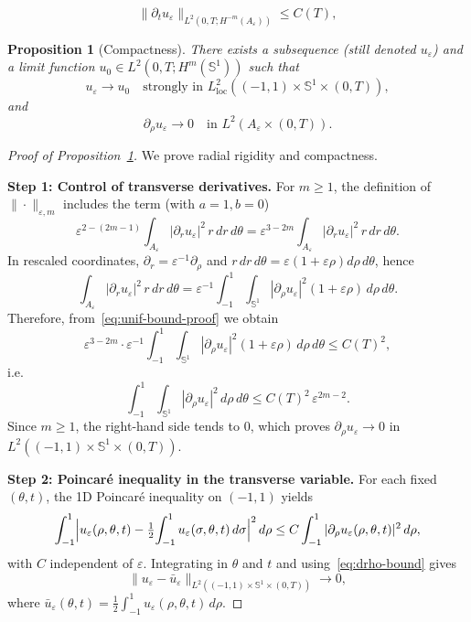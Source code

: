 \documentclass[10pt,a4paper]{amsart}
\newtheorem{proposition}{Proposition}
\begin{document}
\begin{equation}
\label{eq:time-bound}
\|\partial_t u_\varepsilon\|_{L^2(0,T;H^{-m}(A_\varepsilon))}\le C(T),
\end{equation}

\begin{proposition}[Compactness]
\label{prop:compactness}
There exists a subsequence (still denoted $u_\varepsilon$) and a limit function
$u_0\in L^2(0,T;H^m(\mathbb S^1))$ such that
\[
u_\varepsilon \longrightarrow u_0
\quad\text{strongly in }L^2_{\mathrm{loc}}((-1,1)\times\mathbb S^1\times(0,T)),
\]
and
\[
\partial_\rho u_\varepsilon \longrightarrow 0
\quad\text{in }L^2(A_\varepsilon\times(0,T)).
\]
\end{proposition}

\begin{proof}[Proof of Proposition~\ref{prop:compactness}]
We prove radial rigidity and compactness.

\smallskip
\noindent\textbf{Step 1: Control of transverse derivatives.}
For \(m\ge1\), the definition of \(\|\cdot\|_{\varepsilon,m}\) includes the term
(with \(a=1,b=0\))
\[
\varepsilon^{2-(2m-1)}\int_{A_\varepsilon}|\partial_r u_\varepsilon|^2\,r\,dr\,d\theta
=
\varepsilon^{3-2m}\int_{A_\varepsilon}|\partial_r u_\varepsilon|^2\,r\,dr\,d\theta.
\]
In rescaled coordinates, \(\partial_r=\varepsilon^{-1}\partial_\rho\) and
\(r\,dr\,d\theta=\varepsilon(1+\varepsilon\rho)d\rho\,d\theta\), hence
\[
\int_{A_\varepsilon}|\partial_r u_\varepsilon|^2\,r\,dr\,d\theta
=
\varepsilon^{-1}\int_{-1}^1\!\!\int_{\mathbb S^1}
|\partial_\rho u_\varepsilon|^2(1+\varepsilon\rho)\,d\rho\,d\theta.
\]
Therefore, from~\eqref{eq:unif-bound-proof} we obtain
\[
\varepsilon^{3-2m}\cdot \varepsilon^{-1}
\int_{-1}^1\!\!\int_{\mathbb S^1}
|\partial_\rho u_\varepsilon|^2(1+\varepsilon\rho)\,d\rho\,d\theta
\le C(T)^2,
\]
i.e.
\begin{equation}
\label{eq:drho-bound}
\int_{-1}^1\!\!\int_{\mathbb S^1}
|\partial_\rho u_\varepsilon|^2\,d\rho\,d\theta
\le C(T)^2\,\varepsilon^{2m-2}.
\end{equation}
Since \(m\ge1\), the right-hand side tends to \(0\), which proves
\(\partial_\rho u_\varepsilon\to0\) in \(L^2((-1,1)\times\mathbb S^1\times(0,T))\).

\smallskip
\noindent\textbf{Step 2: Poincar\'e inequality in the transverse variable.}
For each fixed \((\theta,t)\), the 1D Poincar\'e inequality on \((-1,1)\) yields
\[
\int_{-1}^1\Bigl|u_\varepsilon(\rho,\theta,t)-\tfrac12\!\int_{-1}^1u_\varepsilon(\sigma,\theta,t)\,d\sigma\Bigr|^2\,d\rho
\le C\int_{-1}^1|\partial_\rho u_\varepsilon(\rho,\theta,t)|^2\,d\rho,
\]
with \(C\) independent of \(\varepsilon\).
Integrating in \(\theta\) and \(t\) and using~\eqref{eq:drho-bound} gives
\begin{equation}
\label{eq:transverse-avg}
\|u_\varepsilon-\bar u_\varepsilon\|_{L^2((-1,1)\times\mathbb S^1\times(0,T))}
\longrightarrow 0,
\end{equation}
where
\(\bar u_\varepsilon(\theta,t)=\tfrac12\int_{-1}^1 u_\varepsilon(\rho,\theta,t)\,d\rho\).


\end{proof}
\end{document}
